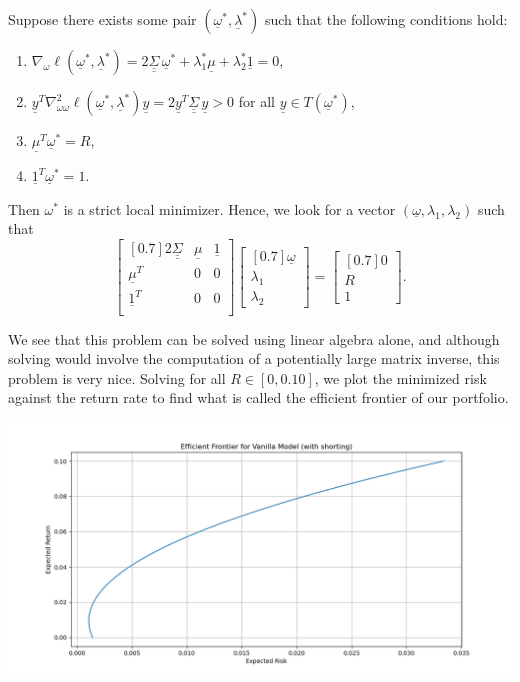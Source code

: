 \documentclass{article}
\renewcommand{\vec}[1]{\underline{#1}}
\newcommand{\mat}[1]{\underline{\underline{#1}}}
\theoremstyle{definition}
\begin{document}
Suppose there exists some pair $(\vec\omega^*, \vec\lambda^*)$ such that the following conditions hold: 
\begin{enumerate}
	\item $\nabla_{\omega} \ell(\vec\omega^*, \vec\lambda^*) = 2\mat\Sigma\,\vec\omega^* + \lambda_1^* \vec\mu + \lambda_2^* \vec{1} = 0$,
	\item $\vec{y}^T\nabla_{\omega\omega}^2\ell(\vec\omega^*, \vec\lambda^*)\vec{y} = 2\vec{y}^T \mat\Sigma \, \vec{y} > 0$ for all $\vec{y} \in T(\vec\omega^*)$,
	\item $\vec\mu^T \vec\omega^* = R$,
	\item $\vec 1^T \vec\omega^* = 1$.
\end{enumerate}
Then $\omega^*$ is a strict local minimizer. Hence, we look for a vector $(\vec\omega, \lambda_1, \lambda_2)$ such that 
$$\begin{bmatrix}[0.7]
	2\mat\Sigma & \vec\mu & \vec{1} \\
	\vec\mu^T & 0 & 0 \\
	\vec{1}^T & 0 & 0 \\
\end{bmatrix} \begin{bmatrix}[0.7] \vec\omega \\ \lambda_1 \\ \lambda_2 \end{bmatrix} = 
\begin{bmatrix}[0.7]
	0 \\ R \\ 1
\end{bmatrix}.$$
\begin{minipage}{0.5\textwidth}
We see that this problem can be solved using linear algebra alone, and although solving would involve the computation of a potentially large matrix inverse, this problem is very nice. Solving for all $R \in [0, 0.10]$, we plot the minimized risk against the return rate to find what is called the efficient frontier of our portfolio. 
\end{minipage}
\begin{minipage}{0.49\textwidth}
	\includegraphics[width=\textwidth]{shortModel.png}
\end{minipage}
\end{document}
